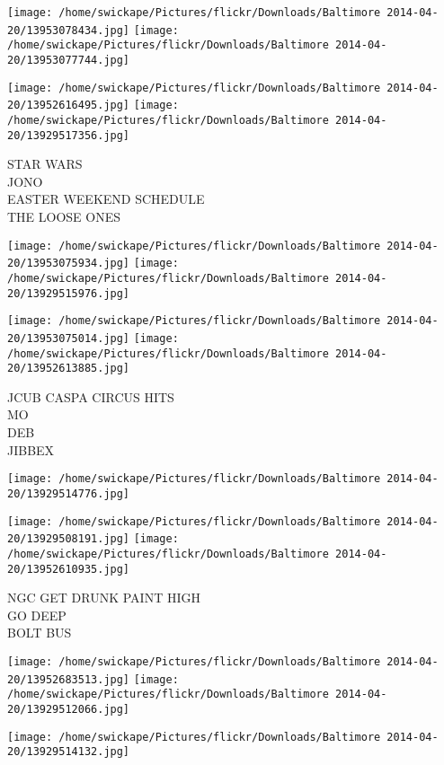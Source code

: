 \documentclass[10pt,letterpaper]{article}
\begin{document}
\texttt{[image: /home/swickape/Pictures/flickr/Downloads/Baltimore 2014-04-20/13953078434.jpg]}
\texttt{[image: /home/swickape/Pictures/flickr/Downloads/Baltimore 2014-04-20/13953077744.jpg]}

\texttt{[image: /home/swickape/Pictures/flickr/Downloads/Baltimore 2014-04-20/13952616495.jpg]}
\texttt{[image: /home/swickape/Pictures/flickr/Downloads/Baltimore 2014-04-20/13929517356.jpg]}

STAR WARS\\
JONO\\
EASTER WEEKEND SCHEDULE\\
THE LOOSE ONES\\
\pagebreak

\texttt{[image: /home/swickape/Pictures/flickr/Downloads/Baltimore 2014-04-20/13953075934.jpg]}
\texttt{[image: /home/swickape/Pictures/flickr/Downloads/Baltimore 2014-04-20/13929515976.jpg]}

\texttt{[image: /home/swickape/Pictures/flickr/Downloads/Baltimore 2014-04-20/13953075014.jpg]}
\texttt{[image: /home/swickape/Pictures/flickr/Downloads/Baltimore 2014-04-20/13952613885.jpg]}

JCUB CASPA CIRCUS HITS\\
MO\\
DEB\\
JIBBEX\\
\pagebreak

\texttt{[image: /home/swickape/Pictures/flickr/Downloads/Baltimore 2014-04-20/13929514776.jpg]}

\vspace{0.25in}
\texttt{[image: /home/swickape/Pictures/flickr/Downloads/Baltimore 2014-04-20/13929508191.jpg]}
\texttt{[image: /home/swickape/Pictures/flickr/Downloads/Baltimore 2014-04-20/13952610935.jpg]}

NGC GET DRUNK PAINT HIGH\\
GO DEEP\\
BOLT BUS\\
\pagebreak

\texttt{[image: /home/swickape/Pictures/flickr/Downloads/Baltimore 2014-04-20/13952683513.jpg]}
\texttt{[image: /home/swickape/Pictures/flickr/Downloads/Baltimore 2014-04-20/13929512066.jpg]}

\vspace{0.25in}
\texttt{[image: /home/swickape/Pictures/flickr/Downloads/Baltimore 2014-04-20/13929514132.jpg]}
\end{document}
